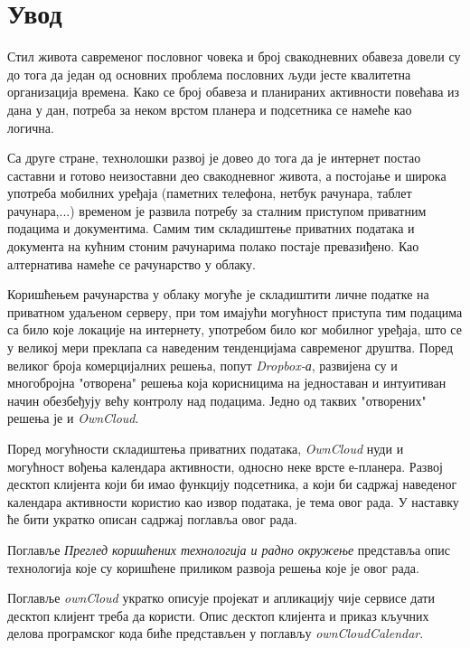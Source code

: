\chapter{Увод}

Стил живота савременог пословног човека и број свакодневних обавеза довели су до тога да један од основних проблема пословних људи јесте квалитетна организација времена. Како се број обавеза и планираних активности повећава из дана у дан, потреба за неком врстом планера и подсетника се намеће као логична.

Са друге стране, технолошки развој је довео до тога да је интернет постао саставни и готово неизоставни део свакодневног живота, а постојање и широка употреба мобилних уређаја (паметних телефона, нетбук рачунара, таблет рачунара,...) временом је развила потребу за сталним приступом приватним подацима и документима. Самим тим складиштење приватних података и документа на кућним стоним рачунарима полако постаје превазиђено. Као алтернатива намеће се рачунарство у облаку.

Коришћењем рачунарства у облаку могуће је складиштити личне податке на приватном удаљеном серверу, при том имајући могућност приступа тим подацима са било које локације на интернету, употребом било ког мобилног уређаја, што се у великој мери преклапа са наведеним тенденцијама савременог друштва. Поред великог броја комерцијалних решења, попут \textit{Dropbox-а}, развијена су и многобројна "отворена" решења која корисницима на једноставан и интуитиван начин обезбеђују већу контролу над подацима. Једно од таквих "отворених" решења је и \textit{OwnCloud}. 

Поред могућности складиштења приватних података, \textit{OwnCloud} нуди и могућност вођења календара активности, односно неке врсте е-планера. Развој десктоп клијента који би имао функцију подсетника, а који би садржај наведеног календара активности користио као извор података, је тема овог рада. У наставку ће бити укратко описан садржај поглавља овог рада.

Поглавље \textit{Преглед коришћених технологија и радно окружење} представља  опис технологија које су коришћене приликом развоја решења које је овог рада.

Поглавље \textit{ownCloud} укратко описује пројекат и апликацију чије сервисе дати десктоп клијент треба да користи. Опис десктоп клијента и приказ кључних делова програмског кода биће представљен у поглављу \textit{ownCloudCalendar}. 